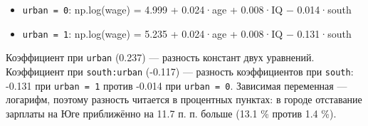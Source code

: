 \documentclass[
  russian,
]{article}
\providecommand{\tightlist}{%
  \setlength{\itemsep}{0pt}\setlength{\parskip}{0pt}}
\begin{document}
\begin{tcolorbox}[enhanced jigsaw, arc=.35mm, bottomrule=.15mm, bottomtitle=1mm, breakable, colback=white, colbacktitle=quarto-callout-tip-color!10!white, colframe=quarto-callout-tip-color-frame, coltitle=black, left=2mm, leftrule=.75mm, opacityback=0, opacitybacktitle=0.6, rightrule=.15mm, title=\textcolor{quarto-callout-tip-color}{\faLightbulb}\hspace{0.5em}{Ответ}, titlerule=0mm, toprule=.15mm, toptitle=1mm]

\begin{itemize}
\tightlist
\item
  \texttt{urban\ =\ 0}: np.log(wage) = 4.999 + 0.024·age + 0.008·IQ −
  0.014·south
\item
  \texttt{urban\ =\ 1}: np.log(wage) = 5.235 + 0.024·age + 0.008·IQ −
  0.131·south
\end{itemize}

Коэффициент при \texttt{urban} (0.237) --- разность констант двух
уравнений. Коэффициент при \texttt{south:urban} (-0.117) --- разность
коэффициентов при \texttt{south}: -0.131 при \texttt{urban\ =\ 1} против
-0.014 при \texttt{urban\ =\ 0}. Зависимая переменная --- логарифм,
поэтому разность читается в процентных пунктах: в городе отставание
зарплаты на Юге приближённо на 11.7 п. п. больше (13.1 \% против 1.4
\%).

\end{tcolorbox}
\end{document}
